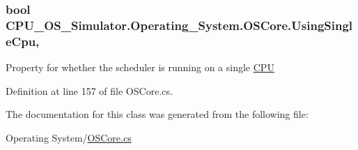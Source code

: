 \subsubsection[{Using\+Single\+Cpu}]{\setlength{\rightskip}{0pt plus 5cm}bool C\+P\+U\+\_\+\+O\+S\+\_\+\+Simulator.\+Operating\+\_\+\+System.\+O\+S\+Core.\+Using\+Single\+Cpu\hspace{0.3cm}{\ttfamily [get]}, {\ttfamily [set]}}\label{class_c_p_u___o_s___simulator_1_1_operating___system_1_1_o_s_core_ac965e1317dc5c6b6ae93c410098dd913}


Property for whether the scheduler is running on a single \hyperlink{namespace_c_p_u___o_s___simulator_1_1_c_p_u}{C\+P\+U} 



Definition at line 157 of file O\+S\+Core.\+cs.



The documentation for this class was generated from the following file\+:\begin{DoxyCompactItemize}
\item 
Operating System/\hyperlink{_o_s_core_8cs}{O\+S\+Core.\+cs}\end{DoxyCompactItemize}

